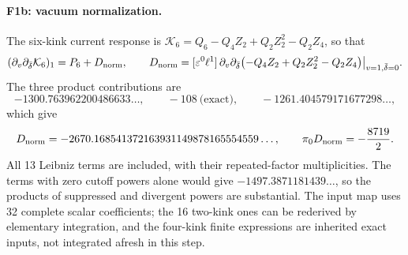 \documentclass[11pt,a4paper]{article}
\numberwithin{equation}{section}
\newcommand{\db}{\bar\delta}
\begin{document}
\paragraph{F1b: vacuum normalization.} The six-kink current response is
$\mathcal K_6=Q_6-Q_4Z_2+Q_2Z_2^2-Q_2Z_4$, so that
\begin{equation}
 (\partial_v\partial_{\db}\mathcal K_6)_1=P_6+D_{\rm norm},\qquad
 D_{\rm norm}=[\varepsilon^0\ell^1]\,\partial_v\partial_{\db}\bigl(-Q_4Z_2+Q_2Z_2^2-Q_2Z_4\bigr)\big|_{v=1,\db=0}.
\end{equation}
The three product contributions are
\begin{equation}
 -1300.763962200486633\ldots,\qquad -108\ \text{(exact)},\qquad -1261.404579171677298\ldots,
\end{equation}
which give
\begin{equation}
 D_{\rm norm}=-2670.168541372163931149878165554559\ldots,\qquad \pi_0D_{\rm norm}=-\frac{8719}{2}.
\end{equation}
All 13 Leibniz terms are included, with their repeated-factor multiplicities. The terms with zero cutoff powers alone
would give $-1497.3871181439\ldots$, so the products of suppressed and divergent powers are substantial. The input map
uses 32 complete scalar coefficients; the 16 two-kink ones can be rederived by elementary integration, and the
four-kink finite expressions are inherited exact inputs, not integrated afresh in this step.
\end{document}
